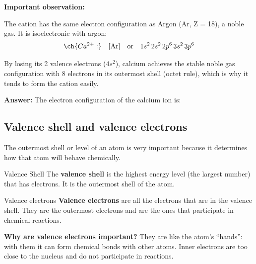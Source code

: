 \begin{exercise}
\begin{solu}
        \textbf{Important observation:}

        The  cation has the same electron configuration as Argon (Ar, Z = 18), a noble gas. It is isoelectronic with argon:
        \[
            \ch{Ca^{2+}:} \quad [\text{Ar}] \quad \text{or} \quad 1s^2 \, 2s^2 \, 2p^6 \, 3s^2 \, 3p^6
        \]

        By losing its 2 valence electrons (\(4s^2\)), calcium achieves the stable noble gas configuration with 8 electrons in its outermost shell (octet rule), which is why it tends to form the  cation easily.

        \textbf{Answer:} The electron configuration of the calcium ion is: 
    \end{solu}
\end{exercise}
\subsection{Valence shell and valence electrons}
The outermost shell or level of an atom is very important because it determines how that atom will behave chemically.
\begin{definition}{Valence Shell}
    The \textbf{valence shell} is the highest energy level (the largest number) that has electrons. It is the outermost shell of the atom.
\end{definition}
\begin{definition}{Valence electrons}
    \textbf{Valence electrons} are all the electrons that are in the valence shell. They are the outermost electrons and are the ones that participate in chemical reactions.
\end{definition}
\begin{remark}
    \textbf{Why are valence electrons important?} They are like the atom's ``hands'': with them it can form chemical bonds with other atoms. Inner electrons are too close to the nucleus and do not participate in reactions.
\end{remark}
